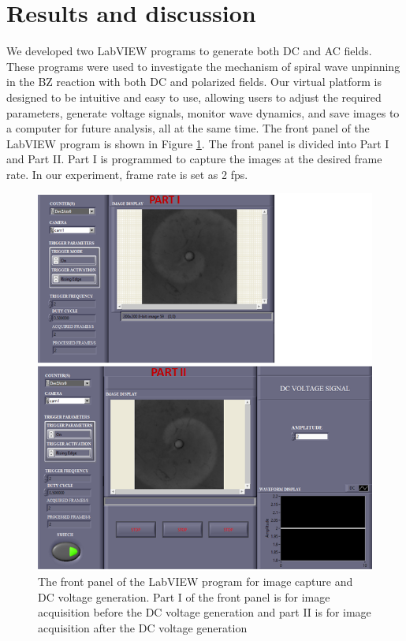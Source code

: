 \documentclass[journal=jacsat,manuscript=article]{achemso}
\begin{document}
\section{Results and discussion}
We developed two LabVIEW programs to generate both DC and AC
fields. These programs were used to investigate the mechanism of
spiral wave unpinning in the BZ reaction with both DC and polarized
fields.  Our virtual platform is designed to be
intuitive and easy to use, allowing users to adjust the required
parameters, generate voltage signals, monitor wave dynamics, and save
images to a computer for future analysis, all at the same time.
The front panel of the LabVIEW program is shown in Figure
\ref{fig:ex3}. The front panel is
divided into Part I and Part II. Part I is programmed to capture the
images at the desired frame rate.
In our experiment, frame rate is set as 2 fps. 
\begin{figure}[H]
    \centering
\includegraphics[width=\linewidth]{Dc_frntpnl.png}
    \caption{The front panel of the LabVIEW program for image capture
      and DC voltage generation. Part I of the front panel is for
      image acquisition before the DC voltage generation and part II
      is for image acquisition after the DC voltage generation}
    \label{fig:ex3}
\end{figure}
\end{document}
